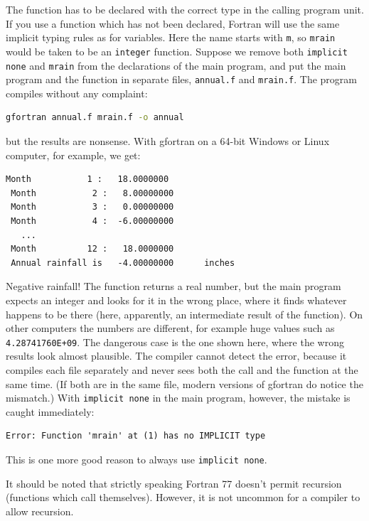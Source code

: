 The function has to be declared with the correct type in the calling program unit. If you use a function which has not been declared, Fortran will use the same implicit typing rules as for variables. Here the name starts with \texttt{m}, so \texttt{mrain} would be taken to be an \texttt{integer} function. Suppose we remove both \texttt{implicit none} and \texttt{mrain} from the declarations of the main program, and put the main program and the function in separate files, \texttt{annual.f} and \texttt{mrain.f}. The program compiles without any complaint:

\begin{lstlisting}[language=bash,basicstyle=\ttfamily\small,columns=fullflexible]
gfortran annual.f mrain.f -o annual
\end{lstlisting}

but the results are nonsense. With gfortran on a 64-bit Windows or Linux computer, for example, we get:

\begin{lstlisting}[style=output]
 Month           1 :   18.0000000
 Month           2 :   8.00000000
 Month           3 :   0.00000000
 Month           4 :  -6.00000000
   ...
 Month          12 :   18.0000000
 Annual rainfall is   -4.00000000      inches
\end{lstlisting}

Negative rainfall! The function returns a real number, but the main program expects an integer and looks for it in the wrong place, where it finds whatever happens to be there (here, apparently, an intermediate result of the function). On other computers the numbers are different, for example huge values such as \texttt{4.28741760E+09}. The dangerous case is the one shown here, where the wrong results look almost plausible. The compiler cannot detect the error, because it compiles each file separately and never sees both the call and the function at the same time. (If both are in the same file, modern versions of gfortran do notice the mismatch.) With \texttt{implicit none} in the main program, however, the mistake is caught immediately:

\begin{lstlisting}[style=output]
Error: Function 'mrain' at (1) has no IMPLICIT type
\end{lstlisting}

This is one more good reason to always use \texttt{implicit none}.

It should be noted that strictly speaking Fortran 77 doesn't permit recursion (functions which call themselves). However, it is not uncommon for a compiler to allow recursion.

